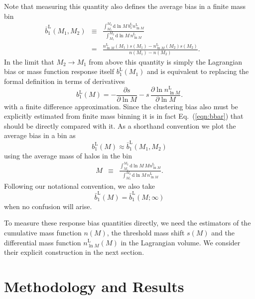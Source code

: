 \documentclass[prd,twocolumn,amsmath,amssymb,floatfix,superscriptaddress]{revtex4-1}
\newcommand{\Lr}{\textrm{L}}
\newcommand{\dr}{\mathrm{d}}
\newcommand{\lnM}{{\ln\!M}}
\begin{document}
Note that measuring this quantity also defines the average bias in a finite mass bin
\begin{eqnarray}
 \bar b_1^\Lr(M_1,M_2) &\equiv& \frac{\int^{M_2}_{M_1} \!\!\dr\lnM\, b_1^{\Lr}n_\lnM^\Lr}
    {\int^{M_2}_{M_1} \!\!\dr\lnM\, n_\lnM^\Lr} \nonumber\\
    &=& \frac{n_\lnM^\Lr(M_1)s(M_1)-n_\lnM^\Lr(M_2)s(M_2)}{n(M_1)-n(M_2)}.
    \qquad
    \label{eqn:bbar}
\end{eqnarray}
In the limit that $M_2 \rightarrow M_1$ from above this quantity is simply the Lagrangian
bias or mass function response itself  $b_1^\Lr(M_1)$
and is equivalent to replacing the formal definition in terms of derivatives
\begin{equation}
    b_1^\Lr (M)
    = - \frac{\partial s}{\partial\lnM} - s \, \frac{\partial\ln n_\lnM^\Lr}{\partial\lnM}.
    \label{eqn:b}
\end{equation}
with a finite difference approximation.  Since the clustering bias also must be explicitly 
estimated from finite mass binning it is in fact Eq.~(\ref{eqn:bbar}) that should
be directly compared with it.  As a shorthand convention
we plot the average bias in a bin as
\begin{equation}
 b_1^\Lr(M) \approx  \bar b_1^\Lr(M_1,M_2)
 \label{eqn:bapprox}
\end{equation} 
using the average mass of halos in the bin
\begin{eqnarray}
M  &\equiv& \frac{\int^{M_2}_{M_1} \!\!\dr\lnM\, M n_\lnM^\Lr}
    {\int^{M_2}_{M_1} \!\!\dr\lnM\, n_\lnM^\Lr} .
    \label{eqn:Mbar}
\end{eqnarray}    
Following our notational  convention, we also take 
\begin{equation}
\bar b_1^\Lr(M) = \bar b_1^\Lr(M;\infty)
\end{equation}
when no confusion will arise.  


To measure these response bias quantities directly, we need the estimators of the cumulative mass function $n(M)$, the threshold mass shift
 $s(M)$ and the differential mass
function $n_\lnM^\Lr(M)$ in the Lagrangian volume.  We consider their explicit construction in the next section.






\section{Methodology and Results}
\label{sec:method}
\end{document}
